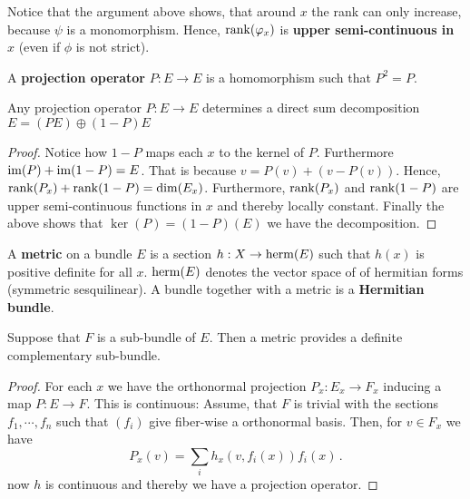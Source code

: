 \begin{cor}\label{cor: rank is upper-semi-continuous}
	Notice that the argument above shows, that around $x$ the rank can only increase, because $\psi$ is a monomorphism. Hence, $\operatorname{\mathrm{rank}}(\varphi_x)$ is \textbf{upper semi-continuous in} $x$ (even if $\phi$ is not strict).
\end{cor}
\begin{definition}\label{def: Projection operator}
	A \textbf{projection operator} $P: E\to E$ is a homomorphism such that $P^2=P$. 
\end{definition}
\begin{lemma}\label{lem: projections determin direct sum compositions}
	Any projection operator $P:E\to E$ determines a direct sum decomposition $E=(PE)\oplus (1-P)E$
\end{lemma}
\begin{proof}
	Notice how $1-P$ maps each $x$ to the kernel of $P$. Furthermore $\mathrm{im}(P)+\mathrm{im}(1-P)=E$. 
	That is because $v=P(v)+(v-P(v))$. Hence, $\operatorname{\mathrm{rank}}(P_x)+\operatorname{\mathrm{rank}}(1-P)=\dim(E_x)$. Furthermore, $\operatorname{\mathrm{rank}}(P_x)$ and $\operatorname{\mathrm{rank}}(1-P)$ are upper semi-continuous functions in $x$ and thereby locally constant. Finally the above shows that $\ker(P)=(1-P)(E)$ we have the decomposition.
\end{proof}
\begin{definition}\label{def: Metrics on Bundles}
	A \textbf{metric} on a bundle $E$ is a section $h:X\to \operatorname{\mathrm{herm}}(E)$ such that $h(x)$ is positive definite for all $x$. $\operatorname{\mathrm{herm}}(E)$ denotes the vector space of of hermitian forms (symmetric sesquilinear). A bundle together with a metric is a \textbf{Hermitian bundle}.
\end{definition}
\begin{lemma}\label{lem: Metric induced complement}
	Suppose that $F$ is a sub-bundle of $E$. Then a metric provides a definite complementary sub-bundle.
\end{lemma}
\begin{proof}
	For each $x$ we have the orthonormal projection $P_x:E_x\to F_x$ inducing a map $P:E \to F$. This is continuous: 
	Assume, that $F$ is trivial with the sections $f_1, \cdots ,f_n$ such that $(f_i)$ give fiber-wise a orthonormal basis. Then, for $v\in F_x$ we have 
	\begin{equation*}
		P_x(v)=\sum_i h_x(v,f_i(x))f_i(x)\,.
	\end{equation*}
	now $h$ is continuous and thereby we have a projection operator. 
\end{proof}
